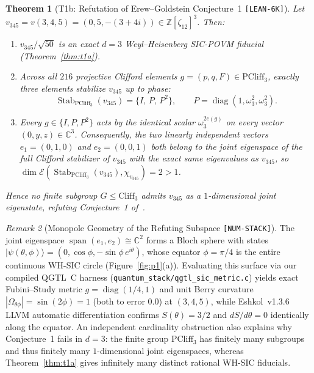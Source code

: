 \documentclass[11pt,letterpaper]{article}
\theoremstyle{plain}
\newtheorem{theorem}{Theorem}[section]
\theoremstyle{definition}
\theoremstyle{remark}
\newtheorem{remark}[theorem]{Remark}
\newcommand{\Z}{\mathbb{Z}}
\newcommand{\C}{\mathbb{C}}
\newcommand{\Span}{\operatorname{span}}
\newcommand{\Stab}{\operatorname{Stab}}
\newcommand{\PCliff}{\mathrm{PCliff}}
\newcommand{\Cliff}{\mathrm{Cliff}}
\newcommand{\ket}[1]{\lvert #1 \rangle}
\newcommand{\tagbadge}[1]{\textnormal{\texttt{\small [#1]}}}
\begin{document}
\begin{theorem}[{T1b: Refutation of Erew--Goldstein Conjecture~1 \tagbadge{LEAN-6K}}]
\label{thm:t1b}
Let $v_{345}=v(3,4,5)=(0,5,-(3+4i))\in\Z[\zeta_{12}]^3$. Then:
\begin{enumerate}[leftmargin=2em,itemsep=2pt]
  \item $v_{345}/\sqrt{50}$ is an exact $d=3$ Weyl--Heisenberg SIC-POVM fiducial (Theorem~\ref{thm:t1a}).
  \item Across all $216$ projective Clifford elements $g=(p,q,F)\in\PCliff_3$, \emph{exactly three} elements stabilize $v_{345}$ up to phase:
  \[
    \Stab_{\PCliff_3}(v_{345}) = \{I,\, P,\, P^2\},
    \qquad P = \operatorname{diag}(1, \omega_3^2, \omega_3^2).
  \]
  \item Every $g\in\{I,P,P^2\}$ acts by the identical scalar $\omega_3^{2c(g)}$ on every vector $(0,y,z)\in\C^3$. Consequently, the two linearly independent vectors $e_1=(0,1,0)$ and $e_2=(0,0,1)$ both belong to the joint eigenspace of the full Clifford stabilizer of $v_{345}$ with the exact same eigenvalues as $v_{345}$, so $\dim\mathcal{E}(\Stab_{\PCliff_3}(v_{345}),\chi_{v_{345}})=2>1$.
\end{enumerate}
Hence \emph{no} finite subgroup $G\le \Cliff_3$ admits $v_{345}$ as a $1$-dimensional joint eigenstate, refuting Conjecture~1 of~\cite{ErewGoldstein2026}.
\end{theorem}

\begin{remark}[{Monopole Geometry of the Refuting Subspace \tagbadge{NUM-STACK}}]
\label{rem:qgtl-monopole}
The joint eigenspace $\Span(e_1,e_2)\cong\C^2$ forms a Bloch sphere with states $\ket{\psi(\theta,\phi)}=(0,\cos\phi,-\sin\phi\,e^{i\theta})$, whose equator $\phi=\pi/4$ is the entire continuous WH-SIC circle (Figure~\ref{fig:p1}(a)). Evaluating this surface via our compiled QGTL~C harness (\nolinkurl{quantum_stack/qgtl_sic_metric.c}) yields exact Fubini--Study metric $g=\operatorname{diag}(1/4,1)$ and unit Berry curvature $|\Omega_{\theta\phi}|=\sin(2\phi)=1$ (both to error $0.0$) at $(3,4,5)$, while Eshkol~v1.3.6 LLVM automatic differentiation confirms $S(\theta)=3/2$ and $dS/d\theta=0$ identically along the equator. An independent cardinality obstruction also explains why Conjecture~1 fails in $d=3$: the finite group $\PCliff_3$ has finitely many subgroups and thus finitely many $1$-dimensional joint eigenspaces, whereas Theorem~\ref{thm:t1a} gives infinitely many distinct rational WH-SIC fiducials.
\end{remark}
\end{document}
